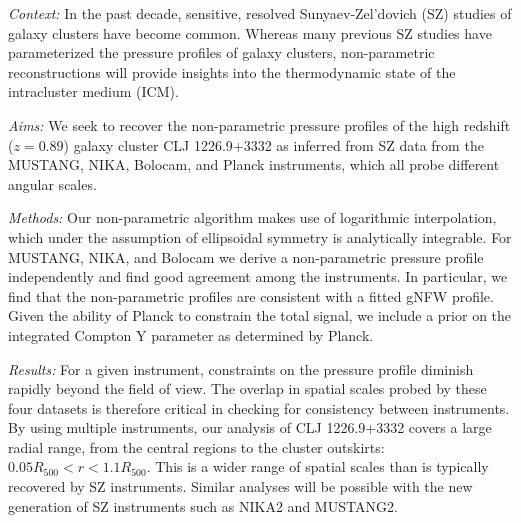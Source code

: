 \documentclass[twocolumn,traditabstract]{aa}
\begin{document}
\abstract
    {\emph{Context:} In the past decade, sensitive, resolved Sunyaev-Zel'dovich (SZ) studies of galaxy
      clusters have become common. Whereas many previous SZ studies have parameterized the pressure
      profiles of galaxy clusters, non-parametric reconstructions will provide insights
      into the thermodynamic state of the intracluster medium (ICM).
      
      \emph{Aims:} We seek to recover the non-parametric pressure profiles of the high redshift ($z=0.89$)
      galaxy cluster CLJ 1226.9+3332 as inferred from SZ data
      from the MUSTANG, NIKA, Bolocam, and Planck instruments, which all probe different angular scales.
     
      \emph{Methods:} Our non-parametric algorithm makes use of logarithmic interpolation,
      which under the assumption of ellipsoidal symmetry is analytically integrable.
      For MUSTANG, NIKA, and Bolocam we derive a non-parametric pressure profile 
      independently and find good agreement among the instruments. In particular, we find
      that the non-parametric profiles are consistent with a fitted gNFW profile.
      Given the ability of Planck to constrain the total signal,
      we include a prior on the integrated Compton Y parameter as determined by Planck.
      
      \emph{Results:}
      For a given instrument, constraints on the pressure profile diminish rapidly beyond the
      field of view. The overlap in spatial scales probed by these four datasets is
      therefore critical in checking for consistency between instruments.
      By using multiple instruments, our analysis of CLJ 1226.9+3332 
      covers a large radial range, from the central regions to the cluster outskirts:
      $0.05 R_{500} < r < 1.1 R_{500}$. This is a wider range of spatial scales
      than is typically recovered by SZ instruments.
      Similar analyses will be possible with the new generation
      of SZ instruments such as NIKA2 and MUSTANG2.}

\end{document}
